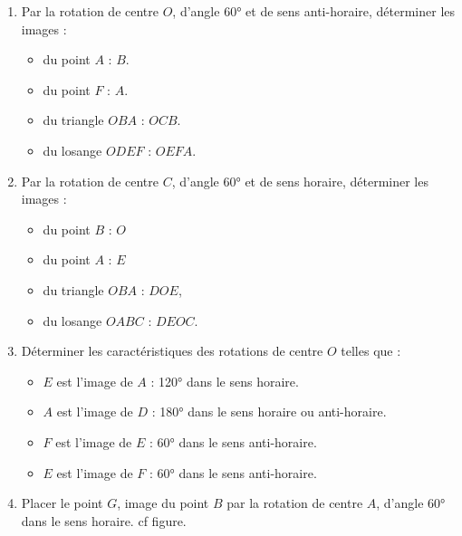 \begin{corrige}
    \begin{enumerate}
        \item Par la rotation de centre $O$, d'angle \ang{60} et de sens anti-horaire, déterminer les images :
        \begin{multicols}{2}
            \begin{itemize}
                \item du point $A$ : {\red $B$}.
                \item du point $F$ : {\red $A$}.
                \item du triangle $OBA$ : {\red $OCB$}.
                \item du losange $ODEF$ : {\red $OEFA$}.
            \end{itemize}
        \end{multicols}
        \item Par la rotation de centre $C$, d'angle \ang{60} et de sens horaire, déterminer les images :
        \begin{multicols}{2}
            \begin{itemize}
                \item du point $B$ : {\red $O$}
                \item du point $A$ : {\red $E$}
                \item du triangle $OBA$ : {\red $DOE$},
                \item du losange $OABC$ : {\red $DEOC$}.
            \end{itemize}
        \end{multicols}
        \item Déterminer les caractéristiques des rotations de centre $O$ telles que :
        \begin{multicols}{2}
            \begin{itemize}
                \item $E$ est l'image de $A$ : {\red \ang{120} dans le sens horaire.}
                \item $A$ est l'image de $D$ : {\red \ang{180} dans le sens horaire ou anti-horaire.}
                \item $F$ est l'image de $E$ : {\red \ang{60} dans le sens anti-horaire.}
                \item $E$ est l'image de $F$ : {\red \ang{60} dans le sens anti-horaire.}
            \end{itemize}
        \end{multicols}
        \item Placer le point $G$, image du point $B$ par la rotation de centre $A$, d'angle \ang{60} dans le sens horaire. {\red cf figure.}

\end{enumerate}
\end{corrige}
